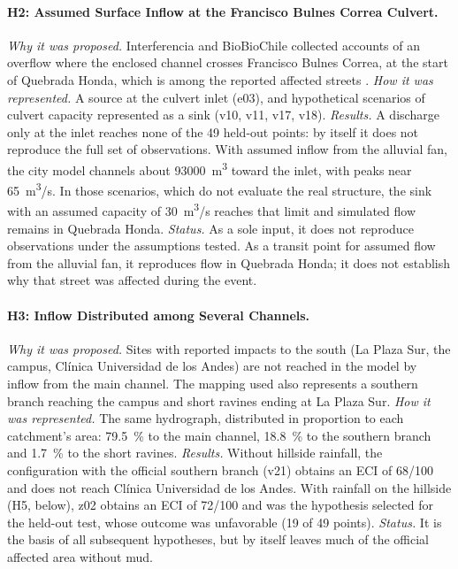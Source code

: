 \paragraph{H2: Assumed Surface Inflow at the Francisco Bulnes Correa Culvert.} \emph{Why it was proposed.} Interferencia and BioBioChile collected accounts of an overflow where the enclosed channel crosses Francisco Bulnes Correa, at the start of Quebrada Honda, which is among the reported affected streets \citep{interferencia2026,biobio2026origen}. \emph{How it was represented.} A source at the culvert inlet (e03), and hypothetical scenarios of culvert capacity represented as a sink (v10, v11, v17, v18). \emph{Results.} A discharge only at the inlet reaches none of the 49 held-out points: by itself it does not reproduce the full set of observations. With assumed inflow from the alluvial fan, the city model channels about \SI{93000}{m^3} toward the inlet, with peaks near \SI{65}{m^3/s}. In those scenarios, which do not evaluate the real structure, the sink with an assumed capacity of \SI{30}{m^3/s} reaches that limit and simulated flow remains in Quebrada Honda. \emph{Status.} As a sole input, it does not reproduce observations under the assumptions tested. As a transit point for assumed flow from the alluvial fan, it reproduces flow in Quebrada Honda; it does not establish why that street was affected during the event.

\paragraph{H3: Inflow Distributed among Several Channels.} \emph{Why it was proposed.} Sites with reported impacts to the south (La Plaza Sur, the campus, Clínica Universidad de los Andes) are not reached in the model by inflow from the main channel. The mapping used also represents a southern branch reaching the campus and short ravines ending at La Plaza Sur. \emph{How it was represented.} The same hydrograph, distributed in proportion to each catchment's area: \SI{79.5}{\percent} to the main channel, \SI{18.8}{\percent} to the southern branch and \SI{1.7}{\percent} to the short ravines. \emph{Results.} Without hillside rainfall, the configuration with the official southern branch (v21) obtains an ECI of 68/100 and does not reach Clínica Universidad de los Andes. With rainfall on the hillside (H5, below), z02 obtains an ECI of 72/100 and was the hypothesis selected for the held-out test, whose outcome was unfavorable (19 of 49 points). \emph{Status.} It is the basis of all subsequent hypotheses, but by itself leaves much of the official affected area without mud.

